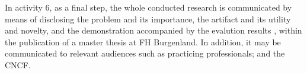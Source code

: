 \noindent
In activity 6, as a final step,
the whole conducted research is communicated by means of
disclosing
the problem and its importance,
the artifact and its utility and novelty,
and the demonstration accompanied by the evalution results
\autocite{designScienceResearchMethodologyForInformationSystemsResearch},
within the publication of a master thesis at FH Burgenland.
In addition, it may be communicated to relevant audiences such as practicing professionals;
and the CNCF.
\bigskip





















%
%
%
%
%
%
%

